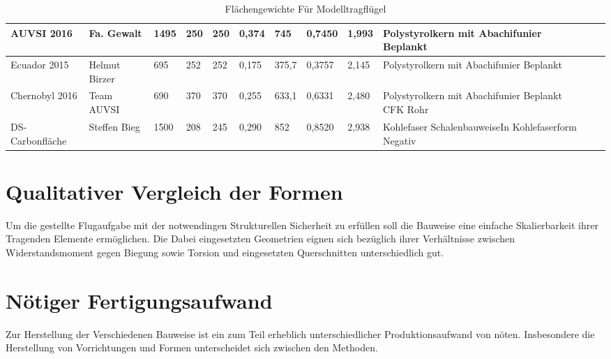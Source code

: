 \begin{table}
\begin{adjustbox}{angle=90}
\begin{tabular}{|l|l|l|l|l|l|l|l|l|l|l|l|}
AUVSI 2016                     & Fa. Gewalt         & 1495            & 250              & 250              & 0,374         & 745         & 0,7450       & 1,993                    & Polystyrolkern mit Abachifunier Beplankt                         \\\hline
Ecuador 2015                   & Helmut Birzer      & 695             & 252              & 252              & 0,175         & 375,7       & 0,3757       & 2,145                    & Polystyrolkern mit Abachifunier Beplankt                         \\\hline
Chernobyl 2016                 & Team AUVSI         & 690             & 370              & 370              & 0,255         & 633,1       & 0,6331       & 2,480                    & Polystyrolkern mit Abachifunier Beplankt CFK Rohr                \\\hline
DS-Carbonfläche               & Steffen Bieg       & 1500            & 208              & 245              & 0,290         & 852         & 0,8520       & 2,938                    & Kohlefaser SchalenbauweiseIn Kohlefaserform Negativ \\  \hline               
\end{tabular}
\end{adjustbox}
\caption{Flächengewichte Für Modelltragflügel}
\label{tab:Flächengewichte Für Modelltragflügel}
\end{table}

\section{Qualitativer Vergleich der Formen}

Um die gestellte Flugaufgabe mit der notwendingen Strukturellen Sicherheit zu erfüllen soll die Bauweise eine einfache Skalierbarkeit ihrer Tragenden Elemente ermöglichen.
Die Dabei eingesetzten Geometrien eignen sich bezüglich ihrer Verhältnisse zwischen Widerstandsmoment gegen Biegung sowie Torsion und eingesetzten Querschnitten unterschiedlich gut.


\section{Nötiger Fertigungsaufwand}

Zur Herstellung der Verschiedenen Bauweise ist ein zum Teil erheblich unterschiedlicher Produktionsaufwand von nöten. Insbesondere die Herstellung von Vorrichtungen und Formen unterscheidet sich zwischen den Methoden. 